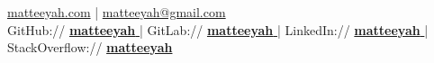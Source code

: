 \documentclass[]{matija-resume}
\begin{document}
%
%
\lastupdated

%
%
 {
\href{https://matteeyah.com}{matteeyah.com} |
\href{mailto:matteeyah@gmail.com}{matteeyah@gmail.com} \\
\vspace{\topsep}
GitHub:// \href{https://github.com/matteeyah}{\bf matteeyah \faExternalLink} |
GitLab:// \href{https://gitlab.com/matteeyah}{\bf matteeyah \faExternalLink} |
LinkedIn://  \href{https://www.linkedin.com/in/matteeyah}{\bf matteeyah \faExternalLink} |
StackOverflow://  \href{https://stackoverflow.com/users/1139722/matteeyah}{\bf matteeyah \faExternalLink}
}
\end{document}

